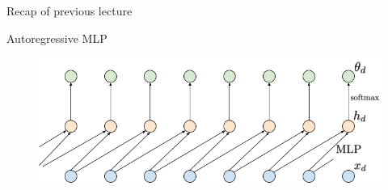 \documentclass{beamer}
\begin{document}
\begin{frame}{Recap of previous lecture}
	\vspace{-0.2cm}
	\begin{block}{Autoregressive MLP}
		\vspace{-0.3cm}
 		\begin{figure}
		     \centering
		     \includegraphics[width=0.5\linewidth]{figs/sequential_MLP}
		 \end{figure}
	\end{block}
	\vspace{-0.4cm}


\end{frame}
\end{document}
